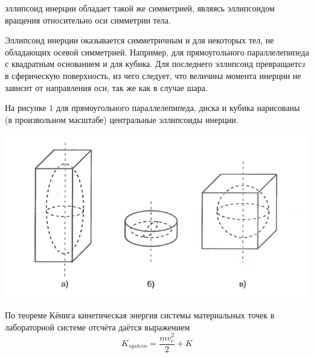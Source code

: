 \documentclass[12pt,a5paper,fleqn]{article}
\begin{document}
\newpage 

\noindent эллипсоид инерции обладает такой же симметрией, являясь эллипсоидом вращения относительно оси симметрии тела.

	Эллипсоид инерции оказывается симметричным и для некоторых тел, не обладающих осевой симметрией. Например, для прямоугольного параллелепипеда с квадратным основанием и для кубика. Для последнего эллипсоид превращаетсz в сферическую поверхность, из чего следует, что величина момента инерции не зависит от направления оси, так же как в случае шара. 
	
	На рисунке $1$ для прямоугольного параллелепипеда, диска и кубика нарисованы (в произвольном масштабе) центральные эллипсоиды инерции.
	
\begin{center}
\includegraphics{2}
\end{center}
	\hspace{0.5cm}По теореме Кёнига кинетическая энергия системы материальных точек в лабораторной системе отсчёта даётся выражением
\[K_{system} = \dfrac{mv_c^2}{2}+ K\]

\newpage
\end{document}
